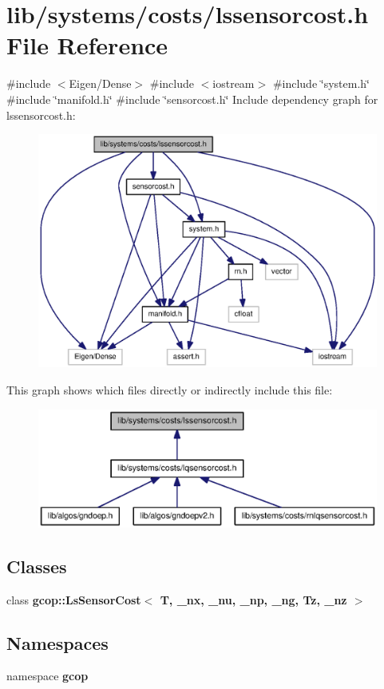 \section{lib/systems/costs/lssensorcost.h \-File \-Reference}
\label{lssensorcost_8h}
{\ttfamily \#include $<$\-Eigen/\-Dense$>$}\*
{\ttfamily \#include $<$iostream$>$}\*
{\ttfamily \#include \char`\"{}system.\-h\char`\"{}}\*
{\ttfamily \#include \char`\"{}manifold.\-h\char`\"{}}\*
{\ttfamily \#include \char`\"{}sensorcost.\-h\char`\"{}}\*
\-Include dependency graph for lssensorcost.\-h\-:\nopagebreak
\begin{figure}[H]
\begin{center}
\leavevmode
\includegraphics[width=350pt]{lssensorcost_8h__incl}
\end{center}
\end{figure}
\-This graph shows which files directly or indirectly include this file\-:\nopagebreak
\begin{figure}[H]
\begin{center}
\leavevmode
\includegraphics[width=350pt]{lssensorcost_8h__dep__incl}
\end{center}
\end{figure}
\subsection*{\-Classes}
\begin{DoxyCompactItemize}
\item 
class {\bf gcop\-::\-Ls\-Sensor\-Cost$<$ T, \-\_\-nx, \-\_\-nu, \-\_\-np, \-\_\-ng, Tz, \-\_\-nz $>$}
\end{DoxyCompactItemize}
\subsection*{\-Namespaces}
\begin{DoxyCompactItemize}
\item 
namespace {\bf gcop}
\end{DoxyCompactItemize}
